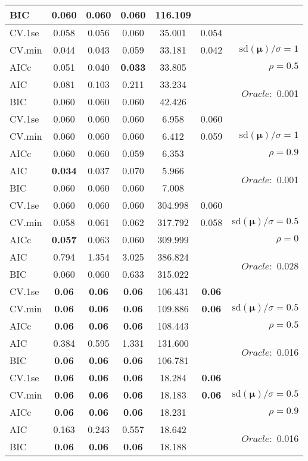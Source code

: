 \begin{table}
\begin{center}
\begin{tabular}{l*{5}{c}|r}
BIC & 0.060 & 0.060 & 0.060 & 116.109 & &  \\
 \hline 
CV.1se & 0.058 & 0.056 & 0.060 & 35.001 & 0.054 & \\
CV.min & 0.044 & 0.043 & 0.059 & 33.181 & 0.042 &  $\mathrm{sd}(\mathbf{\mu})/\sigma=1$ \\
AICc & 0.051 & 0.040 & {\bf 0.033} & 33.805 & & $\rho=0.5$ \\
AIC & 0.081 & 0.103 & 0.211 & 33.234 & &  \multirow{2}{*}{$Oracle: $ 0.001} \\
BIC & 0.060 & 0.060 & 0.060 & 42.426 & &  \\
 \hline 
CV.1se & 0.060 & 0.060 & 0.060 & 6.958 & 0.060 & \\
CV.min & 0.060 & 0.060 & 0.060 & 6.412 & 0.059 &  $\mathrm{sd}(\mathbf{\mu})/\sigma=1$ \\
AICc & 0.060 & 0.060 & 0.059 & 6.353 & & $\rho=0.9$ \\
AIC & {\bf 0.034} & 0.037 & 0.070 & 5.966 & &  \multirow{2}{*}{$Oracle: $ 0.001} \\
BIC & 0.060 & 0.060 & 0.060 & 7.008 & &  \\
 \hline 
CV.1se & 0.060 & 0.060 & 0.060 & 304.998 & 0.060 & \\
CV.min & 0.058 & 0.061 & 0.062 & 317.792 & 0.058 &  $\mathrm{sd}(\mathbf{\mu})/\sigma=0.5$ \\
AICc & {\bf 0.057} & 0.063 & 0.060 & 309.999 & & $\rho=0$ \\
AIC & 0.794 & 1.354 & 3.025 & 386.824 & &  \multirow{2}{*}{$Oracle: $ 0.028} \\
BIC & 0.060 & 0.060 & 0.633 & 315.022 & &  \\
 \hline 
CV.1se & {\bf 0.06} & {\bf 0.06} & {\bf 0.06} & 106.431 & {\bf 0.06} & \\
CV.min & {\bf 0.06} & {\bf 0.06} & {\bf 0.06} & 109.886 & {\bf 0.06} &  $\mathrm{sd}(\mathbf{\mu})/\sigma=0.5$ \\
AICc & {\bf 0.06} & {\bf 0.06} & {\bf 0.06} & 108.443 & & $\rho=0.5$ \\
AIC & 0.384 & 0.595 & 1.331 & 131.600 & &  \multirow{2}{*}{$Oracle: $ 0.016} \\
BIC & {\bf 0.06} & {\bf 0.06} & {\bf 0.06} & 106.781 & &  \\
 \hline 
CV.1se & {\bf 0.06} & {\bf 0.06} & {\bf 0.06} & 18.284 & {\bf 0.06} & \\
CV.min & {\bf 0.06} & {\bf 0.06} & {\bf 0.06} & 18.183 & {\bf 0.06} &  $\mathrm{sd}(\mathbf{\mu})/\sigma=0.5$ \\
AICc & {\bf 0.06} & {\bf 0.06} & {\bf 0.06} & 18.231 & & $\rho=0.9$ \\
AIC & 0.163 & 0.243 & 0.557 & 18.642 & &  \multirow{2}{*}{$Oracle: $ 0.016} \\
BIC & {\bf 0.06} & {\bf 0.06} & {\bf 0.06} & 18.188 & &  \\
 \hline 
\end{tabular}
\end{center}
\vspace{-1cm}
\end{table}




